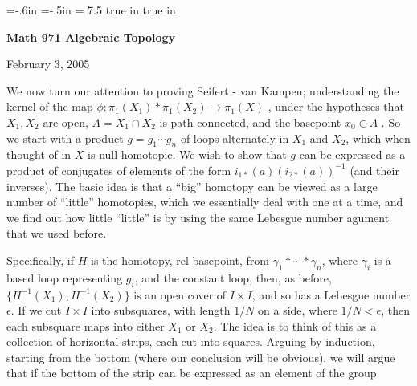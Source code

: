 

\overfullrule=0pt
\parindent=0pt

\nopagenumbers



\voffset=-.6in
\hoffset=-.5in
\hsize = 7.5 true in
 true in




\loadmsbm



\def\ctln{\centerline}
\def\u{\underbar}
\def\ssk{\smallskip}
\def\msk{\medskip}
\def\bsk{\bigskip}
\def\hsk{\hskip.1in}
\def\hhsk{\hskip.2in}
\def\dsl{\displaystyle}
\def\hskp{\hskip1.5in}

\def\lra{$\Leftrightarrow$ }
\def\ra{\rightarrow}
\def\mpto{\logmapsto}
\def\pu{\pi_1}
\def\mpu{$\pi_1$}
\def\sig{\Sigma}
\def\msig{$\Sigma$}
\def\ep{\epsilon}
\def\sset{\subseteq}
\def\del{\partial}




\ctln{\bf Math 971 Algebraic Topology}

\ssk

\ctln{February 3, 2005}

\msk

\msk

We now turn our attention to proving Seifert - van Kampen; understanding
the kernel of the map $\phi : \pu(X_1)*\pu(X_2)\ra\pu(X)$ , 
under the hypotheses
that $X_1,X_2$ are open, $A=X_1\cap X_2$ is path-connected, and the
basepoint $x_0\in A$ . So we start with a product $g = g_1\cdots g_n$ 
of loops alternately in $X_1$ and $X_2$, which when thought of in $X$
is null-homotopic. We wish to show that $g$ can be expressed as a 
product of conjugates of elements of the form $i_{1*}(a)(i_{2*}(a))^{-1}$
(and their inverses). The basic idea is that a ``big'' homotopy can be
viewed as a large number of ``little'' homotopies, which
we essentially deal with one at a time, and we find out how
little ``little'' is by using the same Lebesgue number agument that we
used before.

\msk

Specifically, if $H$ is the homotopy, rel basepoint, from 
$\gamma_1*\cdots *\gamma_n$,
where $\gamma_i$ is a based loop representing $g_i$, and the constant
loop, then, as before, $\{H^{-1}(X_1),H^{-1}(X_2)\}$ is an open cover 
of $I\times I$, and so has a Lebesgue number $\ep$. If we cut
$I\times I$ into subsquares, with length $1/N$ on a side, where $1/N<\ep$,
then each subsquare maps into either $X_1$ or $X_2$. The idea is to 
think of this as a collection of horizontal strips, each cut into squares.
Arguing by induction, starting from the bottom (where our conclusion
will be obvious), we will argue that if the bottom of the strip
can be expressed as an element of the group 

